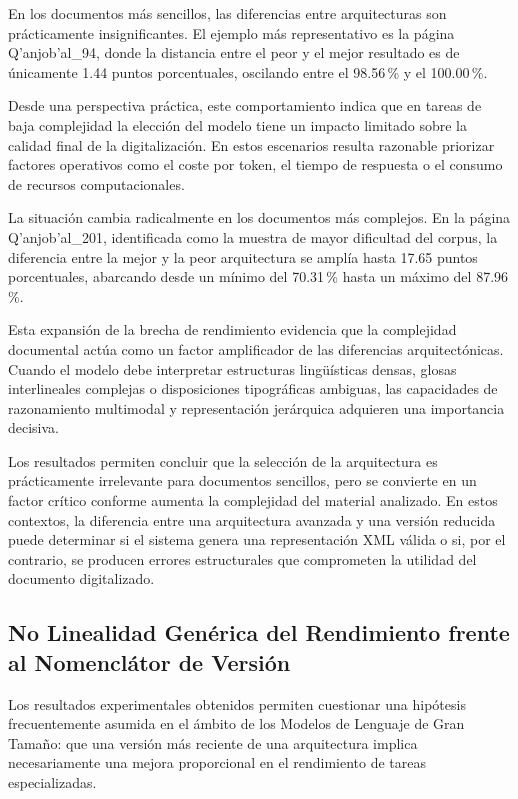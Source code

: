 En los documentos más sencillos, las diferencias entre arquitecturas son prácticamente insignificantes. El ejemplo más representativo es la página Q'anjob'al\_94, donde la distancia entre el peor y el mejor resultado es de únicamente 1.44 puntos porcentuales, oscilando entre el 98.56\,\% y el 100.00\,\%.

Desde una perspectiva práctica, este comportamiento indica que en tareas de baja complejidad la elección del modelo tiene un impacto limitado sobre la calidad final de la digitalización. En estos escenarios resulta razonable priorizar factores operativos como el coste por token, el tiempo de respuesta o el consumo de recursos computacionales.

La situación cambia radicalmente en los documentos más complejos. En la página Q'anjob'al\_201, identificada como la muestra de mayor dificultad del corpus, la diferencia entre la mejor y la peor arquitectura se amplía hasta 17.65 puntos porcentuales, abarcando desde un mínimo del 70.31\,\% hasta un máximo del 87.96\,\%.

Esta expansión de la brecha de rendimiento evidencia que la complejidad documental actúa como un factor amplificador de las diferencias arquitectónicas. Cuando el modelo debe interpretar estructuras lingüísticas densas, glosas interlineales complejas o disposiciones tipográficas ambiguas, las capacidades de razonamiento multimodal y representación jerárquica adquieren una importancia decisiva.

Los resultados permiten concluir que la selección de la arquitectura es prácticamente irrelevante para documentos sencillos, pero se convierte en un factor crítico conforme aumenta la complejidad del material analizado. En estos contextos, la diferencia entre una arquitectura avanzada y una versión reducida puede determinar si el sistema genera una representación XML válida o si, por el contrario, se producen errores estructurales que comprometen la utilidad del documento digitalizado.




\subsection{No Linealidad Genérica del Rendimiento frente al Nomenclátor de Versión}

Los resultados experimentales obtenidos permiten cuestionar una hipótesis frecuentemente asumida en el ámbito de los Modelos de Lenguaje de Gran Tamaño: que una versión más reciente de una arquitectura implica necesariamente una mejora proporcional en el rendimiento de tareas especializadas.

